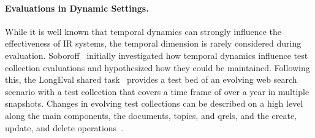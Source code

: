 \paragraph{Evaluations in Dynamic Settings.} While it is well known that temporal dynamics can strongly influence the effectiveness of IR systems, the temporal dimension is rarely considered during evaluation. Soboroff~\cite{DBLP:conf/sigir/Soboroff06} initially investigated how temporal dynamics influence test collection evaluations and hypothesized how they could be maintained. Following this, the LongEval shared task~\cite{DBLP:conf/clef/AlkhalifaBDEAFG24,alkhalifa:2023} provides a test bed of an evolving web search scenario with a test collection that covers a time frame of over a year in multiple snapshots. Changes in evolving test collections can be described on a high level along the main components, the documents, topics, and qrels, and the create, update, and delete operations~\cite{keller:2024}. %
